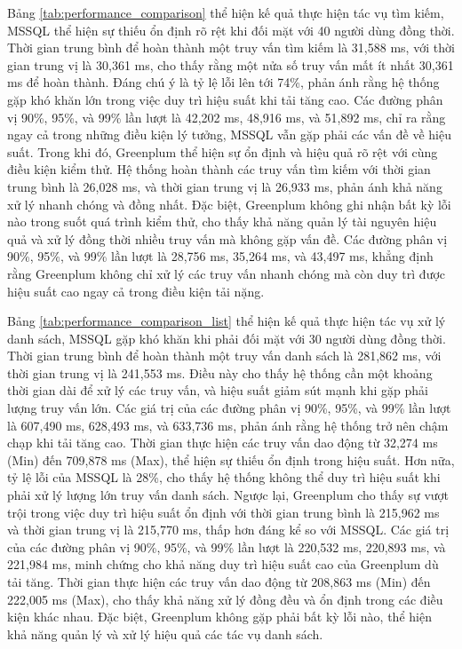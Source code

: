 \documentclass{article}[14pt]
\begin{document}
Bảng \ref{tab:performance_comparison} thể hiện kế quả thực hiện tác vụ tìm kiếm, MSSQL thể hiện sự thiếu ổn định rõ rệt khi đối mặt với 40 người dùng đồng thời. Thời gian trung bình để hoàn thành một truy vấn tìm kiếm là 31,588 ms, với thời gian trung vị là 30,361 ms, cho thấy rằng một nửa số truy vấn mất ít nhất 30,361 ms để hoàn thành. Đáng chú ý là tỷ lệ lỗi lên tới 74\%, phản ánh rằng hệ thống gặp khó khăn lớn trong việc duy trì hiệu suất khi tải tăng cao. Các đường phân vị 90\%, 95\%, và 99\% lần lượt là 42,202 ms, 48,916 ms, và 51,892 ms, chỉ ra rằng ngay cả trong những điều kiện lý tưởng, MSSQL vẫn gặp phải các vấn đề về hiệu suất. Trong khi đó, Greenplum thể hiện sự ổn định và hiệu quả rõ rệt với cùng điều kiện kiểm thử. Hệ thống hoàn thành các truy vấn tìm kiếm với thời gian trung bình là 26,028 ms, và thời gian trung vị là 26,933 ms, phản ánh khả năng xử lý nhanh chóng và đồng nhất. Đặc biệt, Greenplum không ghi nhận bất kỳ lỗi nào trong suốt quá trình kiểm thử, cho thấy khả năng quản lý tài nguyên hiệu quả và xử lý đồng thời nhiều truy vấn mà không gặp vấn đề. Các đường phân vị 90\%, 95\%, và 99\% lần lượt là 28,756 ms, 35,264 ms, và 43,497 ms, khẳng định rằng Greenplum không chỉ xử lý các truy vấn nhanh chóng mà còn duy trì được hiệu suất cao ngay cả trong điều kiện tải nặng.

Bảng \ref{tab:performance_comparison_list} thể hiện kế quả thực hiện tác vụ xử lý danh sách, MSSQL gặp khó khăn khi phải đối mặt với 30 người dùng đồng thời. Thời gian trung bình để hoàn thành một truy vấn danh sách là 281,862 ms, với thời gian trung vị là 241,553 ms. Điều này cho thấy hệ thống cần một khoảng thời gian dài để xử lý các truy vấn, và hiệu suất giảm sút mạnh khi gặp phải lượng truy vấn lớn. Các giá trị của các đường phân vị 90\%, 95\%, và 99\% lần lượt là 607,490 ms, 628,493 ms, và 633,736 ms, phản ánh rằng hệ thống trở nên chậm chạp khi tải tăng cao. Thời gian thực hiện các truy vấn dao động từ 32,274 ms (Min) đến 709,878 ms (Max), thể hiện sự thiếu ổn định trong hiệu suất. Hơn nữa, tỷ lệ lỗi của MSSQL là 28\%, cho thấy hệ thống không thể duy trì hiệu suất khi phải xử lý lượng lớn truy vấn danh sách. Ngược lại, Greenplum cho thấy sự vượt trội trong việc duy trì hiệu suất ổn định với thời gian trung bình là 215,962 ms và thời gian trung vị là 215,770 ms, thấp hơn đáng kể so với MSSQL. Các giá trị của các đường phân vị 90\%, 95\%, và 99\% lần lượt là 220,532 ms, 220,893 ms, và 221,984 ms, minh chứng cho khả năng duy trì hiệu suất cao của Greenplum dù tải tăng. Thời gian thực hiện các truy vấn dao động từ 208,863 ms (Min) đến 222,005 ms (Max), cho thấy khả năng xử lý đồng đều và ổn định trong các điều kiện khác nhau. Đặc biệt, Greenplum không gặp phải bất kỳ lỗi nào, thể hiện khả năng quản lý và xử lý hiệu quả các tác vụ danh sách.
\end{document}
